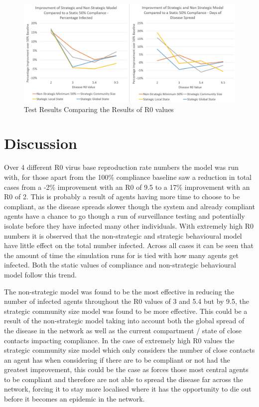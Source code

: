 \documentclass{article}
\begin{document}
\begin{figure}[h!]
\centering
\includegraphics[width=\textwidth]{1}
\caption{Test Results Comparing the Results of R0 values}
\end{figure}
\newpage



\section{Discussion}

Over 4 different R0 virus base reproduction rate numbers the model was run with, for those apart from the 100\% compliance baseline saw a reduction in total cases from a -2\% improvement with an R0 of 9.5 to a 17\% improvement with an R0 of 2. This is probably a result of agents having more time to choose to be compliant, as the disease spreads slower though the system and already compliant agents have a chance to go though a run of surveillance testing and potentially isolate before they have infected many other individuals. With extremely high R0 numbers it is observed that the non-strategic and strategic behavioural model have little effect on the total number infected. Across all cases it can be seen that the amount of time the simulation runs for is tied with how many agents get infected. Both the static values of compliance and non-strategic behavioural model follow this trend. 

The non-strategic model was found to be the most effective in reducing the number of infected agents throughout the R0 values of 3 and 5.4 but by 9.5, the strategic community size model was found to be more effective. This could be a result of the non-strategic model taking into account both the global spread of the disease in the network as well as the current compartment / state of close contacts impacting compliance. In the case of extremely high R0 values the strategic community size model which only considers the number of close contacts an agent has when considering if there are to be compliant or not had the greatest improvement, this could be the case as forces those most central agents to be compliant and therefore are not able to spread the disease far across the network, forcing it to stay more localised where it has the opportunity to die out before it becomes an epidemic in the network.
\end{document}

